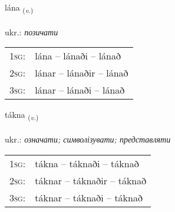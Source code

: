 \documentclass[frontgrid, backgrid]{flacards}\usepackage[]{graphicx}\usepackage[]{xcolor}
\begin{document}
\renewcommand{\flhead}{\vskip5pt \fboxsep=0pt {\small\bfseries\footnotesize Sagnorð | дієслово}}
\renewcommand{\fcfoot}{\vskip5pt \fboxsep=0pt \hspace{2pt}{\small\bfseries\footnotesize 2K}}

\renewcommand{\blhead}{\vskip5pt {\small\bfseries\footnotesize Sagnorð | дієслово }}
\renewcommand{\bcfoot}{\vskip5pt \hspace{2pt}{\small\bfseries\footnotesize 2K}}


{lána \small{\textsubscript{(\textit{v.})}} \\[1ex] %
\textphonetic{[lauːna]} \\
ukr.: \emph{позичати} \\  [2ex]
\renewcommand*{\arraystretch}{0.8}
\begin{tabular}{p{1cm}l}
\textsc{1sg}: & lána -- lánaði -- lánað \\ 
\textsc{2sg}: & lánar -- lánaðir -- lánað \\ 
\textsc{3sg}: & lánar -- lánaði -- lánað \\ 
\end{tabular}
}

\renewcommand{\flhead}{\vskip5pt \fboxsep=0pt {\small\bfseries\footnotesize Sagnorð | дієслово}}
\renewcommand{\fcfoot}{\vskip5pt \fboxsep=0pt \hspace{2pt}{\small\bfseries\footnotesize 2K}}

\renewcommand{\blhead}{\vskip5pt {\small\bfseries\footnotesize Sagnorð | дієслово }}
\renewcommand{\bcfoot}{\vskip5pt \hspace{2pt}{\small\bfseries\footnotesize 2K}}


{tákna \small{\textsubscript{(\textit{v.})}} \\[1ex] %
\textphonetic{[tʰauhkna]} \\
ukr.: \emph{означати; символізувати; представляти} \\  [2ex]
\renewcommand*{\arraystretch}{0.8}
\begin{tabular}{p{1cm}l}
\textsc{1sg}: & tákna -- táknaði -- táknað \\ 
\textsc{2sg}: & táknar -- táknaðir -- táknað \\ 
\textsc{3sg}: & táknar -- táknaði -- táknað \\ 
\end{tabular}
}
\end{document}
